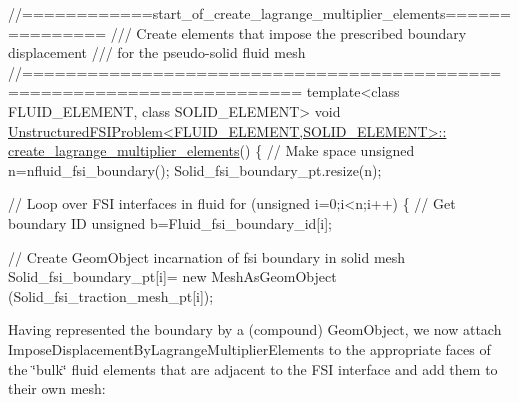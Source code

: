 \begin{DoxyCodeInclude}


\textcolor{comment}{//============start\_of\_create\_lagrange\_multiplier\_elements===============}\textcolor{comment}{}
\textcolor{comment}{/// Create elements that impose the prescribed boundary displacement}
\textcolor{comment}{/// for the pseudo-solid fluid mesh}
\textcolor{comment}{}\textcolor{comment}{//=======================================================================}
\textcolor{keyword}{template}<\textcolor{keyword}{class} FLUID\_ELEMENT, \textcolor{keyword}{class} SOLID\_ELEMENT>
\textcolor{keywordtype}{void} \hyperlink{classUnstructuredFSIProblem_a6f810c300f373cfc79e23d58f95944e3}{UnstructuredFSIProblem<FLUID\_ELEMENT,SOLID\_ELEMENT>::}
\hyperlink{classUnstructuredFSIProblem_a6f810c300f373cfc79e23d58f95944e3}{create\_lagrange\_multiplier\_elements}()
\{
 \textcolor{comment}{// Make space}
 \textcolor{keywordtype}{unsigned} n=nfluid\_fsi\_boundary();
 Solid\_fsi\_boundary\_pt.resize(n);
    
 \textcolor{comment}{// Loop over FSI interfaces in fluid}
 \textcolor{keywordflow}{for} (\textcolor{keywordtype}{unsigned} i=0;i<n;i++)
  \{   
   \textcolor{comment}{// Get boundary ID}
   \textcolor{keywordtype}{unsigned} b=Fluid\_fsi\_boundary\_id[i];
   
   \textcolor{comment}{// Create  GeomObject incarnation of fsi boundary in solid mesh}
   Solid\_fsi\_boundary\_pt[i]=
    \textcolor{keyword}{new} MeshAsGeomObject
    (Solid\_fsi\_traction\_mesh\_pt[i]);

\end{DoxyCodeInclude}


Having represented the boundary by a (compound) {\ttfamily Geom\+Object}, we now attach {\ttfamily Impose\+Displacement\+By\+Lagrange\+Multiplier\+Elements} to the appropriate faces of the \char`\"{}bulk\char`\"{} fluid elements that are adjacent to the F\+SI interface and add them to their own mesh\+:


